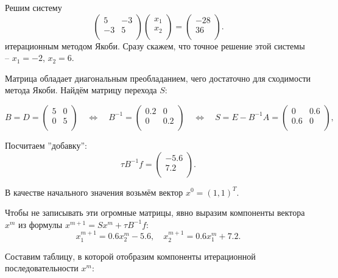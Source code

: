 \documentclass{article}
\begin{document}
\begin{example}\label{eq:jacobi_method_example}
	Решим систему
	\[
		\begin{pmatrix}
			5	& -3 \\
			-3	& 5  \\
		\end{pmatrix}
		\begin{pmatrix}
			x_1 \\
			x_2 \\
		\end{pmatrix}
		=
		\begin{pmatrix}
			-28 \\
			36  \\
		\end{pmatrix}
		.
	\]
	итерационным методом Якоби. Сразу скажем, что точное решение этой
	системы -- $x_1=-2$, $x_2=6$.

	Матрица обладает диагональным преобладанием, чего достаточно для
	сходимости метода Якоби. Найдём матрицу перехода $S$:

	\[
		B=D=
		\begin{pmatrix}
			5	& 0 \\
			0	& 5  \\
		\end{pmatrix}
		\quad\Leftrightarrow\quad
		B^{-1}=
		\begin{pmatrix}
			0.2	& 0   \\
			0	& 0.2 \\
		\end{pmatrix}
		\quad\Leftrightarrow\quad
		S=E-B^{-1}A=
		\begin{pmatrix}
			0	& 0.6 \\
			0.6	& 0   \\
		\end{pmatrix}
		,
	\]

	Посчитаем ''добавку'':
	\[\tau B^{-1}f=
		\begin{pmatrix}
			-5.6 \\
			7.2  \\
		\end{pmatrix}
		.
	\]

	В качестве начального значения возьмём вектор $x^0=(1,1)^T$.

	Чтобы не записывать эти огромные матрицы, явно выразим компоненты
	вектора $x^m$ из формулы $x^{m+1}=Sx^m+\tau B^{-1}f$:
	\[x_1^{m+1}=0.6x_2^m-5.6,\quad x_2^{m+1}=0.6x_1^m+7.2.\]

	Составим таблицу, в которой отобразим компоненты итерационной
	последовательности $x^m$:


\end{example}
\end{document}
